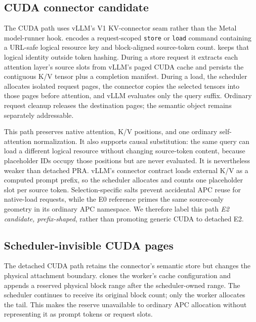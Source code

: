 \documentclass[10pt]{article}
\begin{document}
\subsection{CUDA connector candidate}
The CUDA path uses vLLM's V1 KV-connector seam rather than the Metal
model-runner hook.  encodes a
request-scoped \texttt{store} or \texttt{load} command containing a URL-safe
logical resource key and block-aligned source-token count.
 keeps that logical identity outside
token hashing. During a store request it extracts each attention layer's
source slots from vLLM's paged CUDA cache and persists the contiguous K/V
tensor plus a completion manifest. During a load, the scheduler allocates
isolated request pages, the connector copies the selected tensors into those
pages before attention, and vLLM evaluates only the query suffix. Ordinary
request cleanup releases the destination pages; the semantic object remains
separately addressable.

This path preserves native attention, K/V positions, and one ordinary
self-attention normalization. It also supports causal substitution: the same
query can load a different logical resource without changing source-token
content, because placeholder IDs occupy those positions but are never
evaluated. It is nevertheless weaker than detached PRA. vLLM's connector
contract loads external K/V as a computed prompt prefix, so the scheduler
allocates and counts one placeholder slot per source token. Selection-specific
salts prevent accidental APC reuse for native-load requests, while the E0
reference primes the same source-only geometry in its ordinary APC namespace.
We therefore label this path \emph{E2 candidate, prefix-shaped}, rather than
promoting generic CUDA to detached E2.

\subsection{Scheduler-invisible CUDA pages}
The detached CUDA path retains the connector's semantic store but changes the
physical attachment boundary.  clones the
worker's cache configuration and appends a reserved physical block range after
the scheduler-owned range. The scheduler continues to receive its original
block count; only the worker allocates the tail. This makes the reserve
unavailable to ordinary APC allocation without representing it as prompt
tokens or request slots.
\end{document}
